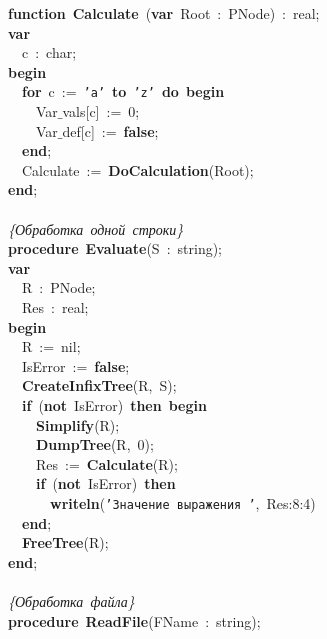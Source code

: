 \mbox{}\textbf{function}\ \textbf{Calculate}\ (\textbf{var}\ Root\ :\ PNode)\ :\ real; \\
\mbox{}\textbf{var} \\
\mbox{}\ \ c\ :\ char; \\
\mbox{}\textbf{begin} \\
\mbox{}\ \ \textbf{for}\ c\ :=\ \texttt{'a'}\ \textbf{to}\ \texttt{'z'}\ \textbf{do}\ \textbf{begin} \\
\mbox{}\ \ \ \ Var$\_$vals[c]\ :=\ 0; \\
\mbox{}\ \ \ \ Var$\_$def[c]\ :=\ \textbf{false}; \\
\mbox{}\ \ \textbf{end}; \\
\mbox{}\ \ Calculate\ :=\ \textbf{DoCalculation}(Root); \\
\mbox{}\textbf{end}; \\
\mbox{} \\
\mbox{}\textit{\{Обработка\ одной\ строки\}} \\
\mbox{}\textbf{procedure}\ \textbf{Evaluate}(S\ :\ string); \\
\mbox{}\textbf{var} \\
\mbox{}\ \ R\ :\ PNode; \\
\mbox{}\ \ Res\ :\ real; \\
\mbox{}\textbf{begin} \\
\mbox{}\ \ R\ :=\ nil; \\
\mbox{}\ \ IsError\ :=\ \textbf{false}; \\
\mbox{}\ \ \textbf{CreateInfixTree}(R,\ S); \\
\mbox{}\ \ \textbf{if}\ (\textbf{not}\ IsError)\ \textbf{then}\ \textbf{begin} \\
\mbox{}\ \ \ \ \textbf{Simplify}(R); \\
\mbox{}\ \ \ \ \textbf{DumpTree}(R,\ 0); \\
\mbox{}\ \ \ \ Res\ :=\ \textbf{Calculate}(R); \\
\mbox{}\ \ \ \ \textbf{if}\ (\textbf{not}\ IsError)\ \textbf{then} \\
\mbox{}\ \ \ \ \ \ \textbf{writeln}(\texttt{'Значение\ выражения\ '},\ Res:8:4) \\
\mbox{}\ \ \textbf{end}; \\
\mbox{}\ \ \textbf{FreeTree}(R); \\
\mbox{}\textbf{end}; \\
\mbox{} \\
\mbox{}\textit{\{Обработка\ файла\}} \\
\mbox{}\textbf{procedure}\ \textbf{ReadFile}(FName\ :\ string); \\
